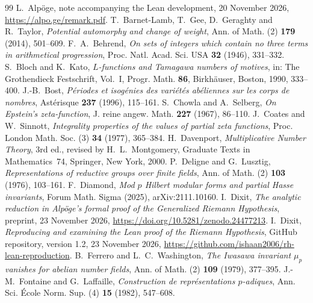 \documentclass[11pt]{amsart}
\theoremstyle{plain}
\theoremstyle{definition}
\numberwithin{equation}{section}
\begin{document}
\begin{thebibliography}{99}
 L.~Alp\"oge, note accompanying the Lean development, 20 November 2026,
  \url{https://alpo.ge/remark.pdf}.
 T.~Barnet-Lamb, T.~Gee, D.~Geraghty and R.~Taylor, \emph{Potential automorphy and
  change of weight}, Ann. of Math. (2) \textbf{179} (2014), 501--609.
 F.~A.~Behrend, \emph{On sets of integers which contain no three terms in
  arithmetical progression}, Proc. Natl. Acad. Sci. USA \textbf{32} (1946), 331--332.
 S.~Bloch and K.~Kato, \emph{$L$-functions and Tamagawa numbers of motives},
  in: The Grothendieck Festschrift, Vol.~I, Progr. Math. \textbf{86}, Birkh\"auser, Boston, 1990,
  333--400.
 J.-B.~Bost, \emph{P\'eriodes et isog\'enies des vari\'et\'es ab\'eliennes
  sur les corps de nombres}, Ast\'erisque \textbf{237} (1996), 115--161.
 S.~Chowla and A.~Selberg, \emph{On Epstein's zeta-function}, J. reine
  angew. Math. \textbf{227} (1967), 86--110.
 J.~Coates and W.~Sinnott, \emph{Integrality properties of the values of
  partial zeta functions}, Proc. London Math. Soc. (3) \textbf{34} (1977), 365--384.
 H.~Davenport, \emph{Multiplicative Number Theory}, 3rd ed., revised by
H.~L.~Montgomery, Graduate Texts in Mathematics~74, Springer, New York, 2000.
 P.~Deligne and G.~Lusztig, \emph{Representations of reductive groups
  over finite fields}, Ann. of Math. (2) \textbf{103} (1976), 103--161.
 F.~Diamond, \emph{Mod $p$ Hilbert modular forms and partial Hasse invariants},
  Forum Math. Sigma (2025), arXiv:2111.10160.
 I.~Dixit, \emph{The analytic reduction in Alp\"oge's formal proof of the
  Generalized Riemann Hypothesis}, preprint, 23 November 2026,
  \url{https://doi.org/10.5281/zenodo.24477213}.
 I.~Dixit, \emph{Reproducing and examining the Lean proof of the Riemann
  Hypothesis}, GitHub repository, version 1.2, 23 November 2026,
  \url{https://github.com/ishaan2006/rh-lean-reproduction}.
 B.~Ferrero and L.~C.~Washington, \emph{The Iwasawa invariant $\mu_p$
  vanishes for abelian number fields}, Ann. of Math. (2) \textbf{109} (1979), 377--395.
 J.-M.~Fontaine and G.~Laffaille, \emph{Construction de
  repr\'esentations $p$-adiques}, Ann. Sci. \'Ecole Norm. Sup. (4) \textbf{15} (1982), 547--608.

\end{thebibliography}
\end{document}
